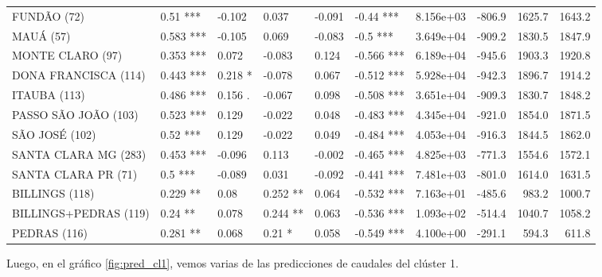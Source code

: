 \documentclass[12pt,oneside]{book}\usepackage[]{graphicx}\usepackage[]{color}
\newenvironment{knitrout}{}{} %
\theoremstyle{definition} %
\begin{document}
\begin{knitrout}
\begin{table}
{\begin{tabular}[t]{llllllrrrr}
FUNDÃO (72) & 0.51 *** & -0.102 & 0.037 & -0.091 & -0.44 *** & 8.156e+03 & -806.9 & 1625.7 & 1643.2\\
\addlinespace
\rowcolor{gray!6}  MAUÁ (57) & 0.583 *** & -0.105 & 0.069 & -0.083 & -0.5 *** & 3.649e+04 & -909.2 & 1830.5 & 1847.9\\
MONTE CLARO (97) & 0.353 *** & 0.072 & -0.083 & 0.124 & -0.566 *** & 6.189e+04 & -945.6 & 1903.3 & 1920.8\\
\rowcolor{gray!6}  DONA FRANCISCA (114) & 0.443 *** & 0.218 * & -0.078 & 0.067 & -0.512 *** & 5.928e+04 & -942.3 & 1896.7 & 1914.2\\
ITAUBA (113) & 0.486 *** & 0.156 . & -0.067 & 0.098 & -0.508 *** & 3.651e+04 & -909.3 & 1830.7 & 1848.2\\
\rowcolor{gray!6}  PASSO SÃO JOÃO (103) & 0.523 *** & 0.129 & -0.022 & 0.048 & -0.483 *** & 4.345e+04 & -921.0 & 1854.0 & 1871.5\\
\addlinespace
SÃO JOSÉ (102) & 0.52 *** & 0.129 & -0.022 & 0.049 & -0.484 *** & 4.053e+04 & -916.3 & 1844.5 & 1862.0\\
\rowcolor{gray!6}  SANTA CLARA MG (283) & 0.453 *** & -0.096 & 0.113 & -0.002 & -0.465 *** & 4.825e+03 & -771.3 & 1554.6 & 1572.1\\
SANTA CLARA PR (71) & 0.5 *** & -0.089 & 0.031 & -0.092 & -0.441 *** & 7.481e+03 & -801.0 & 1614.0 & 1631.5\\
\rowcolor{gray!6}  BILLINGS (118) & 0.229 ** & 0.08 & 0.252 ** & 0.064 & -0.532 *** & 7.163e+01 & -485.6 & 983.2 & 1000.7\\
BILLINGS+PEDRAS (119) & 0.24 ** & 0.078 & 0.244 ** & 0.063 & -0.536 *** & 1.093e+02 & -514.4 & 1040.7 & 1058.2\\
\addlinespace
\rowcolor{gray!6}  PEDRAS (116) & 0.281 ** & 0.068 & 0.21 * & 0.058 & -0.549 *** & 4.100e+00 & -291.1 & 594.3 & 611.8\\
\bottomrule
\end{tabular}}
\end{table}


\end{knitrout}

Luego, en el gráfico \ref{fig:pred_cl1}, vemos varias de las predicciones de caudales del clúster 1.
\end{document}
